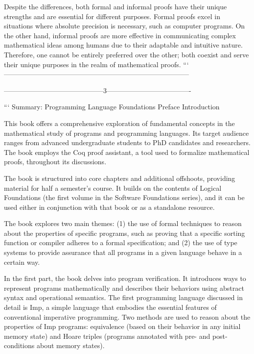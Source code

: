 Despite the differences, both formal and informal proofs have their unique strengths and are essential for different purposes. Formal proofs excel in situations where absolute precision is necessary, such as computer programs. On the other hand, informal proofs are more effective in communicating complex mathematical ideas among humans due to their adaptable and intuitive nature. Therefore, one cannot be entirely preferred over the other; both coexist and serve their unique purposes in the realm of mathematical proofs.
```
---------------------------------------------------------------------------------

--------------------------------------------3-------------------------------------

```
Summary: Programming Language Foundations Preface Introduction

This book offers a comprehensive exploration of fundamental concepts in the mathematical study of programs and programming languages. Its target audience ranges from advanced undergraduate students to PhD candidates and researchers. The book employs the Coq proof assistant, a tool used to formalize mathematical proofs, throughout its discussions.

The book is structured into core chapters and additional offshoots, providing material for half a semester's course. It builds on the contents of Logical Foundations (the first volume in the Software Foundations series), and it can be used either in conjunction with that book or as a standalone resource.

The book explores two main themes: (1) the use of formal techniques to reason about the properties of specific programs, such as proving that a specific sorting function or compiler adheres to a formal specification; and (2) the use of type systems to provide assurance that all programs in a given language behave in a certain way.

In the first part, the book delves into program verification. It introduces ways to represent programs mathematically and describes their behaviors using abstract syntax and operational semantics. The first programming language discussed in detail is Imp, a simple language that embodies the essential features of conventional imperative programming. Two methods are used to reason about the properties of Imp programs: equivalence (based on their behavior in any initial memory state) and Hoare triples (programs annotated with pre- and post-conditions about memory states).

